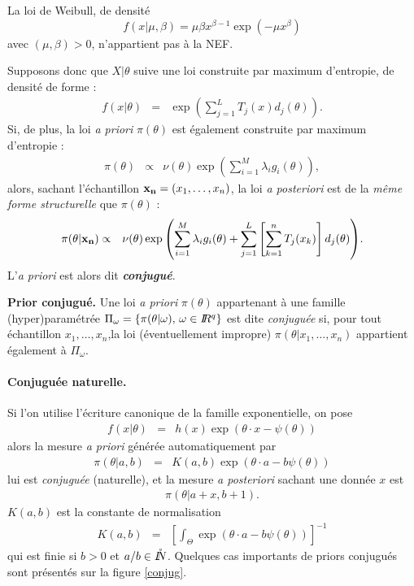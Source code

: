 \begin{exo}
La loi de Weibull, de densité 
$$
f(x|\mu,\beta) = \mu\beta x^{\beta-1}\exp\left(-\mu x^{\beta}\right)
$$
avec $(\mu,\beta)>0$, n'appartient pas à la NEF. \\
\end{exo}

Supposons donc que $X|\theta$ suive une loi construite par maximum d'entropie, de densité de forme :
\begin{eqnarray*}
f(x|\theta) &  = & \exp\left(\sum\limits_{j=1}^L T_j(x)d_j(\theta) \right).
\end{eqnarray*}
Si, de plus, la loi {\it a priori} $\pi(\theta)$ est également construite par maximum d'entropie :
\begin{eqnarray*}
{\pi(\theta)} & \propto & {\nu(\theta) \exp\left(\sum\limits_{i=1}^M \lambda_i g_i(\theta)\right)}, 
\end{eqnarray*}  
alors, sachant l'échantillon ${\bf x_n}=(x_1,\ldots,x_n)$, la loi {\it a posteriori} est de la \emph{même forme structurelle} que $\pi(\theta)$ :
\begin{eqnarray*}
{\pi(\theta|{\bf x_n})} & \propto & {\nu(\theta) \exp\left(\sum\limits_{i=1}^M \lambda_i g_i(\theta) + \sum\limits_{j=1}^L \left[\sum\limits_{k=1}^n T_j(x_k)\right]d_j(\theta)\right)}. 
\end{eqnarray*}  
 L'{\it a priori} est alors dit \emph{{\bf conjugué}}. 
 
 \begin{definition}{\bf Prior conjugué.}
 Une loi {\it a priori} $\pi(\theta)$ appartenant à une famille (hyper)paramétrée $\Pi_{\omega}=\{\pi(\theta|\omega), \, \omega\in I\!\!R^q\}$ est dite \emph{conjuguée} si, pour tout échantillon $x_1,\ldots,x_n$,la loi (éventuellement impropre) $\pi(\theta|x_1,\ldots,x_n)$ appartient également à $\Pi_{\omega}$. 
 \end{definition}

\paragraph{Conjuguée naturelle.} Si l'on utilise l'écriture canonique de la famille exponentielle, on pose
\begin{eqnarray*}
f(x|\theta) & = & h(x)\exp(\theta\cdot x- \psi(\theta))
\end{eqnarray*}  
alors la mesure {\it a priori} générée automatiquement par
\begin{eqnarray*}
\pi(\theta|a,b) & = & K(a,b)\exp(\theta\cdot a - b\psi(\theta))
\end{eqnarray*}   
lui est \emph{conjuguée} (naturelle), et la mesure {\it a posteriori} sachant une donnée $x$ est
\begin{eqnarray*}
\pi(\theta|a+x,b+1).
\end{eqnarray*}   
$K(a,b)$ est la constante de normalisation   
\begin{eqnarray*}
K(a,b) & = & \left[ \int_{\Theta}  \exp(\theta\cdot a - b\psi(\theta))\right]^{-1}
\end{eqnarray*}
qui est finie si $b>0$ et $a/b\in\mathring{I\!\!N}$. Quelques cas importants de priors conjugués sont présentés sur la figure \ref{conjug}.

